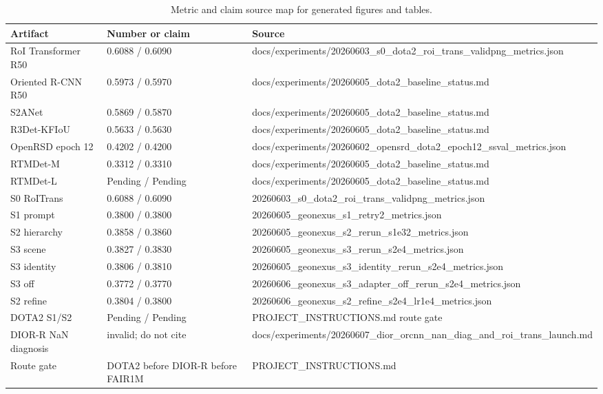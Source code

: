 \begin{table}[t]
\centering
\caption{Metric and claim source map for generated figures and tables.}
\label{tab:artifact\_sources}
\begin{tabular}{lll}
\toprule
Artifact & Number or claim & Source \\
\midrule
RoI Transformer R50 & 0.6088 / 0.6090 & docs/experiments/20260603\_s0\_dota2\_roi\_trans\_validpng\_metrics.json \\
Oriented R-CNN R50 & 0.5973 / 0.5970 & docs/experiments/20260605\_dota2\_baseline\_status.md \\
S2ANet & 0.5869 / 0.5870 & docs/experiments/20260605\_dota2\_baseline\_status.md \\
R3Det-KFIoU & 0.5633 / 0.5630 & docs/experiments/20260605\_dota2\_baseline\_status.md \\
OpenRSD epoch 12 & 0.4202 / 0.4200 & docs/experiments/20260602\_opensrd\_dota2\_epoch12\_ssval\_metrics.json \\
RTMDet-M & 0.3312 / 0.3310 & docs/experiments/20260605\_dota2\_baseline\_status.md \\
RTMDet-L & Pending / Pending & docs/experiments/20260605\_dota2\_baseline\_status.md \\
S0 RoITrans & 0.6088 / 0.6090 & 20260603\_s0\_dota2\_roi\_trans\_validpng\_metrics.json \\
S1 prompt & 0.3800 / 0.3800 & 20260605\_geonexus\_s1\_retry2\_metrics.json \\
S2 hierarchy & 0.3858 / 0.3860 & 20260605\_geonexus\_s2\_rerun\_s1e32\_metrics.json \\
S3 scene & 0.3827 / 0.3830 & 20260605\_geonexus\_s3\_rerun\_s2e4\_metrics.json \\
S3 identity & 0.3806 / 0.3810 & 20260605\_geonexus\_s3\_identity\_rerun\_s2e4\_metrics.json \\
S3 off & 0.3772 / 0.3770 & 20260606\_geonexus\_s3\_adapter\_off\_rerun\_s2e4\_metrics.json \\
S2 refine & 0.3804 / 0.3800 & 20260606\_geonexus\_s2\_refine\_s2e4\_lr1e4\_metrics.json \\
DOTA2 S1/S2 & Pending / Pending & PROJECT\_INSTRUCTIONS.md route gate \\
DIOR-R NaN diagnosis & invalid; do not cite & docs/experiments/20260607\_dior\_orcnn\_nan\_diag\_and\_roi\_trans\_launch.md \\
Route gate & DOTA2 before DIOR-R before FAIR1M & PROJECT\_INSTRUCTIONS.md \\
\bottomrule
\end{tabular}
\end{table}
